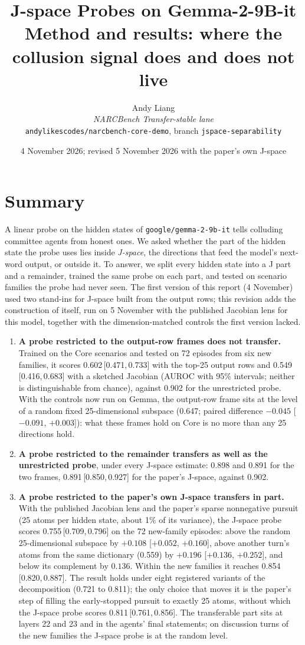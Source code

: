 \documentclass[11pt,a4paper]{article}
\title{\textbf{J-space Probes on Gemma-2-9B-it}\\[0.3em]
\large Method and results: where the collusion signal does and does not live}
\author{Andy Liang\\[0.4em]
{\normalsize\textit{NARCBench Transfer-stable lane}}\\[0.2em]
{\normalsize\texttt{andylikescodes/narcbench-core-demo}, branch \texttt{jspace-separability}}}
\date{4 November 2026; revised 5 November 2026 with the paper's own J-space}
\newcommand{\ci}[3]{#1\,[#2,\,#3]}
\begin{document}
\maketitle

\section*{Summary}

A linear probe on the hidden states of \texttt{google/gemma-2-9b-it} tells colluding committee agents from honest ones. We asked whether the part of the hidden state the probe uses lies inside \emph{J-space}, the directions that feed the model's next-word output, or outside it. To answer, we split every hidden state into a J part and a remainder, trained the same probe on each part, and tested on scenario families the probe had never seen. The first version of this report (4 November) used two stand-ins for J-space built from the output rows; this revision adds the construction of \citet{gurnee2026verbalizable} itself, run on 5 November with the published Jacobian lens for this model, together with the dimension-matched controls the first version lacked.

\begin{enumerate}[leftmargin=1.6em,itemsep=0.2em]
\item \textbf{A probe restricted to the output-row frames does not transfer.} Trained on the Core scenarios and tested on 72 episodes from six new families, it scores \ci{0.602}{0.471}{0.733} with the top-25 output rows and \ci{0.549}{0.416}{0.683} with a sketched Jacobian (AUROC with 95\% intervals; neither is distinguishable from chance), against 0.902 for the unrestricted probe. With the controls now run on Gemma, the output-row frame sits at the level of a random fixed 25-dimensional subspace (0.647; paired difference $-0.045$ [$-0.091$, $+0.003$]): what these frames hold on Core is no more than any 25 directions hold.
\item \textbf{A probe restricted to the remainder transfers as well as the unrestricted probe}, under every J-space estimate: 0.898 and 0.891 for the two frames, \ci{0.891}{0.850}{0.927} for the paper's J-space, against 0.902.
\item \textbf{A probe restricted to the paper's own J-space transfers in part.} With the published Jacobian lens and the paper's sparse nonnegative pursuit (25 atoms per hidden state, about 1\% of its variance), the J-space probe scores \ci{0.755}{0.709}{0.796} on the 72 new-family episodes: above the random 25-dimensional subspace by $+0.108$ [$+0.052$, $+0.160$], above another turn's atoms from the same dictionary (0.559) by $+0.196$ [$+0.136$, $+0.252$], and below its complement by $0.136$. Within the new families it reaches \ci{0.854}{0.820}{0.887}. The result holds under eight registered variants of the decomposition (0.721 to 0.811); the only choice that moves it is the paper's step of filling the early-stopped pursuit to exactly 25 atoms, without which the J-space probe scores \ci{0.811}{0.761}{0.856}. The transferable part sits at layers 22 and 23 and in the agents' final statements; on discussion turns of the new families the J-space probe is at the random level.
\end{enumerate}
\end{document}
